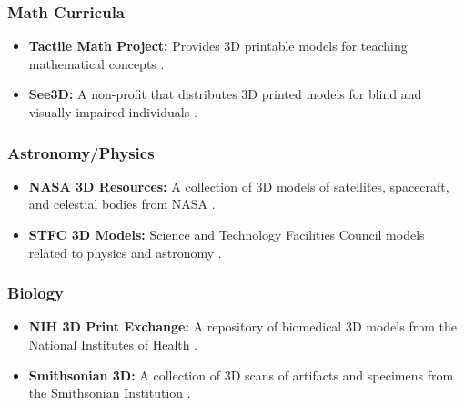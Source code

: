 \subsubsection{Math Curricula}
\begin{itemize}
	\item \textbf{Tactile Math Project:} Provides 3D printable models for teaching mathematical concepts \supercite{TactileMath}.
	\item \textbf{See3D:} A non-profit that distributes 3D printed models for blind and visually impaired individuals \supercite{See3D}.
\end{itemize}

\subsubsection{Astronomy/Physics}
\begin{itemize}
	\item \textbf{NASA 3D Resources:} A collection of 3D models of satellites, spacecraft, and celestial bodies from NASA \supercite{NASA3D}.
	\item \textbf{STFC 3D Models:} Science and Technology Facilities Council models related to physics and astronomy \supercite{STFC}.
\end{itemize}

\subsubsection{Biology}
\begin{itemize}
	\item \textbf{NIH 3D Print Exchange:} A repository of biomedical 3D models from the National Institutes of Health \supercite{NIH3D}.
	\item \textbf{Smithsonian 3D:} A collection of 3D scans of artifacts and specimens from the Smithsonian Institution \supercite{Smithsonian3D}.
\end{itemize}

